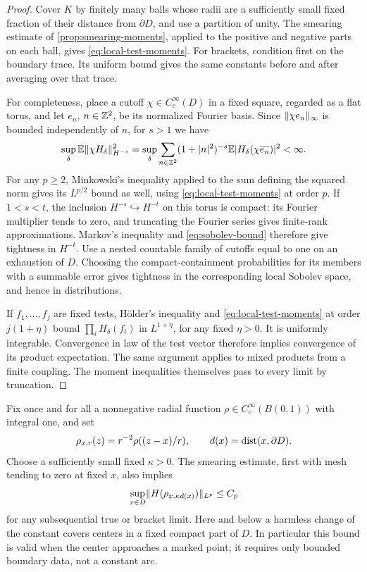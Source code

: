 \begin{proof}
Cover $K$ by finitely many balls whose radii are a sufficiently small
fixed fraction of their distance from $\partial D$, and use a partition
of unity. The smearing estimate of \cref{prop:smearing-moments}, applied
to the positive and negative parts on each ball, gives
\eqref{eq:local-test-moments}. For brackets, condition first on the
boundary trace. Its uniform bound gives the same constants before and
after averaging over that trace.

For completeness, place a cutoff $\chi\in C_c^\infty(D)$ in a fixed
square, regarded as a flat torus, and let $e_n$, $n\in\mathbb Z^2$, be its
normalized Fourier basis. Since $\lVert\chi e_n\rVert_\infty$ is bounded
independently of $n$, for $s>1$ we have
\begin{equation}
 \sup_\delta\mathbb E\lVert\chi H_\delta\rVert_{H^{-s}}^2
 =\sup_\delta\sum_{n\in\mathbb Z^2}(1+|n|^2)^{-s}
                  \mathbb E|H_\delta(\chi\overline{e_n})|^2<\infty.
 \label{eq:sobolev-bound}
\end{equation}
For any $p\ge2$, Minkowski's inequality applied to the sum defining
the squared norm gives its $L^{p/2}$ bound as well, using
\eqref{eq:local-test-moments} at order $p$. If $1<s<t$, the inclusion
$H^{-s}\hookrightarrow H^{-t}$ on this torus is compact: its Fourier
multiplier tends to zero, and truncating the Fourier series gives
finite-rank approximations. Markov's inequality and
\eqref{eq:sobolev-bound} therefore give tightness in $H^{-t}$.
Use a nested countable family of cutoffs equal to one on an exhaustion
of $D$. Choosing the compact-containment probabilities for its members
with a summable error gives tightness in the corresponding local
Sobolev space, and hence in distributions.

If $f_1,\ldots,f_j$ are fixed tests, H\"older's inequality and
\eqref{eq:local-test-moments} at order $j(1+\eta)$ bound
$\prod_i H_\delta(f_i)$ in $L^{1+\eta}$, for any fixed $\eta>0$.
It is uniformly integrable. Convergence in law of the test vector
therefore implies convergence of its product expectation. The same
argument applies to mixed products from a finite coupling. The
moment inequalities themselves pass to every limit by truncation.
\end{proof}

Fix once and for all a nonnegative radial function
$\rho\in C_c^\infty(B(0,1))$ with integral one, and set
\[
 \rho_{x,r}(z)=r^{-2}\rho((z-x)/r),\qquad
 d(x)=\operatorname{dist}(x,\partial D).
\]
Choose a sufficiently small fixed $\kappa>0$. The smearing estimate,
first with mesh tending to zero at fixed $x$, also implies
\begin{equation}
 \sup_{x\in D}\lVert H(\rho_{x,\kappa d(x)})\rVert_{L^p}\le C_p
 \label{eq:depth-moment-bound}
\end{equation}
for any subsequential true or bracket limit. Here and below a harmless
change of the constant covers centers in a fixed compact part of $D$.
In particular this bound is valid when the center approaches a marked
point; it requires only bounded boundary data, not a constant arc.

